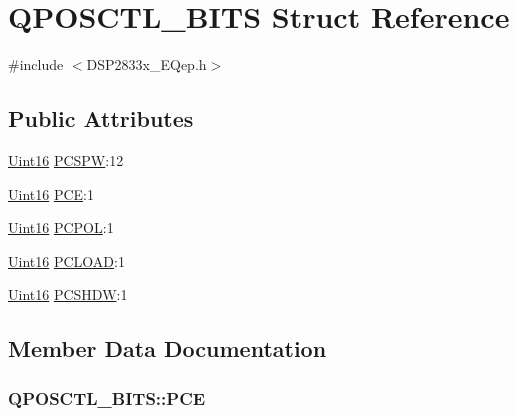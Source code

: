 \hypertarget{struct_q_p_o_s_c_t_l___b_i_t_s}{}\section{Q\+P\+O\+S\+C\+T\+L\+\_\+\+B\+I\+T\+S Struct Reference}
\label{struct_q_p_o_s_c_t_l___b_i_t_s}


{\ttfamily \#include $<$D\+S\+P2833x\+\_\+\+E\+Qep.\+h$>$}

\subsection*{Public Attributes}
\begin{DoxyCompactItemize}
\item 
\hyperlink{_d_s_p2833x___device_8h_a59a9f6be4562c327cbfb4f7e8e18f08b}{Uint16} \hyperlink{struct_q_p_o_s_c_t_l___b_i_t_s_ac4eb2edac6f95bb0f9229d6b5929749f}{P\+C\+S\+P\+W}\+:12
\item 
\hyperlink{_d_s_p2833x___device_8h_a59a9f6be4562c327cbfb4f7e8e18f08b}{Uint16} \hyperlink{struct_q_p_o_s_c_t_l___b_i_t_s_a9dd7129b8d00a00c1b0c90c013fd5ab6}{P\+C\+E}\+:1
\item 
\hyperlink{_d_s_p2833x___device_8h_a59a9f6be4562c327cbfb4f7e8e18f08b}{Uint16} \hyperlink{struct_q_p_o_s_c_t_l___b_i_t_s_ae42571e0b4c0a85f8edd03dd42f7b74c}{P\+C\+P\+O\+L}\+:1
\item 
\hyperlink{_d_s_p2833x___device_8h_a59a9f6be4562c327cbfb4f7e8e18f08b}{Uint16} \hyperlink{struct_q_p_o_s_c_t_l___b_i_t_s_a25257724e310db61a8a086a6e47186a2}{P\+C\+L\+O\+A\+D}\+:1
\item 
\hyperlink{_d_s_p2833x___device_8h_a59a9f6be4562c327cbfb4f7e8e18f08b}{Uint16} \hyperlink{struct_q_p_o_s_c_t_l___b_i_t_s_ad926082d34bc3065f9f344336b1c8084}{P\+C\+S\+H\+D\+W}\+:1
\end{DoxyCompactItemize}


\subsection{Member Data Documentation}
\hypertarget{struct_q_p_o_s_c_t_l___b_i_t_s_a9dd7129b8d00a00c1b0c90c013fd5ab6}{}
\subsubsection[{P\+C\+E}]{ Q\+P\+O\+S\+C\+T\+L\+\_\+\+B\+I\+T\+S\+::\+P\+C\+E}\label{struct_q_p_o_s_c_t_l___b_i_t_s_a9dd7129b8d00a00c1b0c90c013fd5ab6}
\hypertarget{struct_q_p_o_s_c_t_l___b_i_t_s_a25257724e310db61a8a086a6e47186a2}{}
